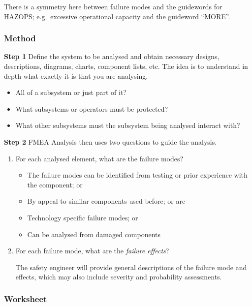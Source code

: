 There is a symmetry here between failure modes and the guidewords for HAZOPS; e.g.\ excessive operational capacity and the guideword ``MORE''.

\subsubsection*{Method}

\textbf{Step 1} Define the system to be analysed and obtain necessary designs, descriptions, diagrams, charts, component lists, etc.  The idea is to understand in depth what exactly it is that you are analysing.  

  \begin{itemize}
    \item All of a subsystem  or just part of it?  
    \item What subsystems or operators must be protected? 
    \item What other subsystems must the subsystem being analysed
      interact with?
  \end{itemize}

\textbf{Step 2} FMEA Analysis then uses two questions to guide the
  analysis.

  \begin{enumerate}
    \item For each analysed element, what are the failure modes?
      \begin{itemize}
        \item The failure modes can be identified from testing or
          prior experience with the component; or
        \item By appeal to similar components used before; or are  
        \item Technology specific failure modes; or
        \item Can be analysed from damaged components
      \end{itemize}

    \item For each failure mode, what are the \emph{failure effects}?

     The safety engineer will provide general descriptions of the failure mode and effects, which may also include severity and probability assessments.

 \end{enumerate}

\subsubsection*{Worksheet}

